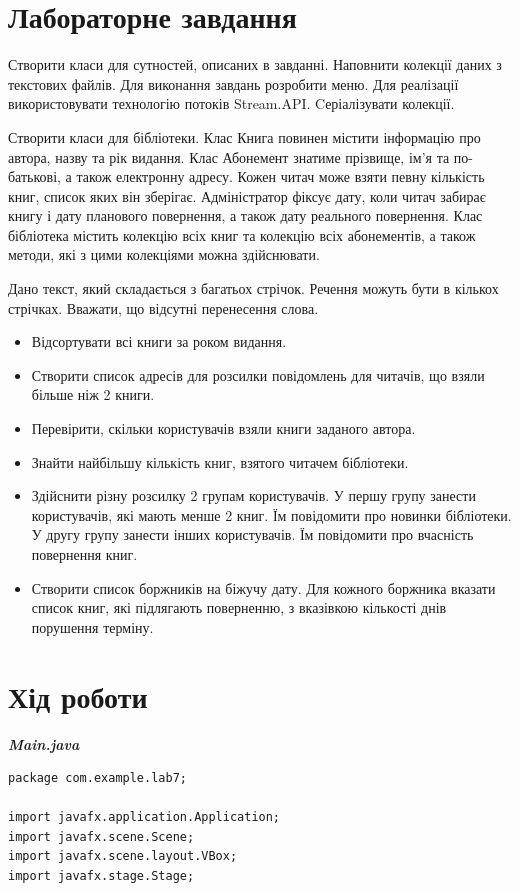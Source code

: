 \documentclass[14pt]{extreport}
\begin{document}
\begin{normalsize}
	\section*{Лабораторне завдання}
Створити класи для сутностей, описаних в завданні. Наповнити колекції даних
з текстових файлів. Для виконання завдань розробити меню. Для реалізації
використовувати технологію потоків Stream.API. Cеріалізувати колекції.	
	
	Створити класи для бібліотеки. Клас Книга повинен містити інформацію про
	автора, назву та рік видання.
	Клас Абонемент знатиме прізвище, ім’я та по-батькові, а також електронну
	адресу.
	Кожен читач може взяти певну кількість книг, список яких він зберігає.
	Адміністратор фіксує дату, коли читач забирає книгу і дату планового
	повернення, а також дату реального повернення.
	Клас бібліотека містить колекцію всіх книг та колекцію всіх абонементів, а
	також методи, які з цими колекціями можна здійснювати.
	
	Дано текст, який складається з багатьох стрічок. Речення можуть бути в кількох
	стрічках. Вважати, що відсутні перенесення слова.
	\begin{itemize}
\item Відсортувати всі книги за роком видання.
\item Створити список адресів для розсилки повідомлень для читачів, що взяли
більше ніж 2 книги.
\item Перевірити, скільки користувачів взяли книги заданого автора.
\item Знайти найбільшу кількість книг, взятого читачем бібліотеки.
\item Здійснити різну розсилку 2 групам користувачів. У першу групу занести
користувачів, які мають менше 2 книг. Їм повідомити про новинки бібліотеки. У
другу групу занести інших користувачів. Їм повідомити про вчасність повернення
книг.
\item  Створити список боржників на біжучу дату. Для кожного боржника вказати
список книг, які підлягають поверненню, з вказівкою кількості днів порушення
терміну.
	\end{itemize}
	\section*{Хід роботи}

	\textbf{\textit{Main.java}}
	\begin{lstlisting}
package com.example.lab7;

import javafx.application.Application;
import javafx.scene.Scene;
import javafx.scene.layout.VBox;
import javafx.stage.Stage;


\end{lstlisting}
\end{normalsize}
\end{document}
